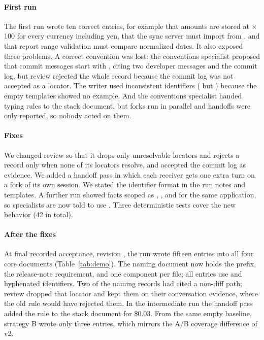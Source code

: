 \paragraph{First run} The first run wrote ten correct entries, for example that amounts are stored at $\times$100 for every currency including yen, that the sync server must import  from , and that report range validation must compare normalized dates. It also exposed three problems. A correct convention was lost: the conventions specialist proposed that commit messages start with \code{[AI]}, citing two developer messages and the commit log, but review rejected the whole record because the commit log was not accepted as a locator. The writer used inconsistent identifiers ( but ) because the empty templates showed no example. And the conventions specialist handed typing rules to the stack document, but forks run in parallel and handoffs were only reported, so nobody acted on them.

\paragraph{Fixes} We changed review so that it drops only unresolvable locators and rejects a record only when none of its locators resolve, and accepted the commit log as evidence. We added a handoff pass in which each receiver gets one extra turn on a fork of its own session. We stated the identifier format in the run notes and templates. A further run showed facts scoped as , , and  for the same application, so specialists are now told to use . Three deterministic tests cover the new behavior (42 in total).

\paragraph{After the fixes} At final recorded acceptance, revision , the run wrote fifteen entries into all four core documents (Table~\ref{tab:demo}). The naming document now holds the \code{[AI]} prefix, the release-note requirement, and one component per file; all entries use  and hyphenated identifiers. Two of the naming records had cited a non-diff path; review dropped that locator and kept them on their conversation evidence, where the old rule would have rejected them. In the intermediate run the handoff pass added the  rule to the stack document for \$0.03. From the same empty baseline, strategy B wrote only three entries, which mirrors the A/B coverage difference of v2.

